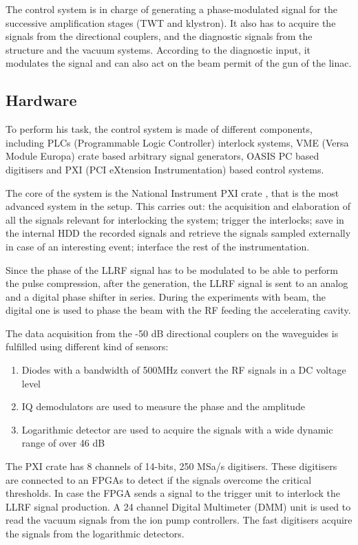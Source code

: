 The control system is in charge of generating a phase-modulated signal for the successive amplification stages (TWT and klystron). It also has to acquire the signals from the directional couplers, and the diagnostic signals from the structure and the vacuum systems. According to the diagnostic input, it modulates the signal and can also act on the beam permit of the gun of the linac. 

\subsection[Hardware]{Hardware}

To perform his task, the control system is made of different components, including PLCs (Programmable Logic Controller) interlock systems,  VME (Versa Module Europa) crate based arbitrary signal generators, OASIS PC based digitisers and PXI (PCI eXtension Instrumentation) based control systems.

The core of the system is the National Instrument PXI crate \cite{NI:PXI}, that is the most advanced system in the setup. This carries out: the acquisition and elaboration of all the signals relevant for interlocking the system; trigger the interlocks; save in the internal HDD the recorded signals and retrieve the signals sampled externally in case of an interesting event; interface the rest of the instrumentation.


Since the phase of the LLRF signal has to be modulated to be able to perform the pulse compression, after the generation, the LLRF signal is sent to an analog and a digital phase shifter in series. During the experiments with beam, the digital one is used to phase the beam with the RF feeding the accelerating cavity.

The data acquisition from the -50 dB directional couplers on the waveguides is fulfilled using different kind of sensors:
\begin{enumerate}
\item Diodes with a bandwidth of 500MHz convert the RF signals in a DC voltage level
\item IQ demodulators are used to measure the phase and the amplitude
\item Logarithmic detector are used to acquire the signals with a wide dynamic range of over 46 dB
\end{enumerate}

The PXI crate has 8 channels of 14-bits, 250 MSa/s digitisers. These digitisers are connected to an FPGAs to detect if the signals overcome the critical thresholds. In case the FPGA sends a signal to the trigger unit to interlock the LLRF signal production. A 24 channel Digital Multimeter (DMM) unit is used to read the vacuum signals from the ion pump controllers. The fast digitisers acquire the signals from the logarithmic detectors. 

